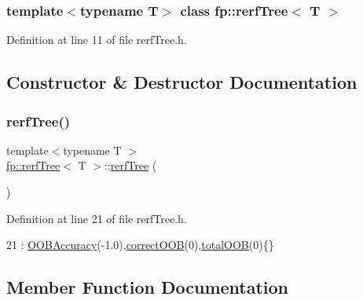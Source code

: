 \subsubsection*{template$<$typename T$>$\newline
class fp\+::rerf\+Tree$<$ T $>$}



Definition at line 11 of file rerf\+Tree.\+h.



\subsection{Constructor \& Destructor Documentation}
\mbox{\label{classfp_1_1rerfTree_a74790abf9a1287184e1874623a3e97bf}} 
\subsubsection{\texorpdfstring{rerf\+Tree()}{rerfTree()}}
{\footnotesize\ttfamily template$<$typename T $>$ \\
\hyperlink{classfp_1_1rerfTree}{fp\+::rerf\+Tree}$<$ T $>$\+::\hyperlink{classfp_1_1rerfTree}{rerf\+Tree} (\begin{DoxyParamCaption}{ }\end{DoxyParamCaption})\hspace{0.3cm}{\ttfamily [inline]}}



Definition at line 21 of file rerf\+Tree.\+h.


\begin{DoxyCode}
21 : \hyperlink{classfp_1_1rerfTree_a95ef33dc19b2956bb2320e3f89e966b0}{OOBAccuracy}(-1.0),\hyperlink{classfp_1_1rerfTree_a07330eb1a89870eb8d3c07d0c1af0ec9}{correctOOB}(0),\hyperlink{classfp_1_1rerfTree_aaac789925d8100bf33cdbb440df8e593}{totalOOB}(0)\{\}
\end{DoxyCode}


\subsection{Member Function Documentation}
\mbox{\label{classfp_1_1rerfTree_a57086b38168e07aaf9cd9e9f1842058d}} 
